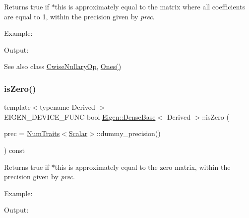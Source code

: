 \begin{DoxyReturn}{Returns}
true if $\ast$this is approximately equal to the matrix where all coefficients are equal to 1, within the precision given by {\itshape prec}.
\end{DoxyReturn}
Example\+: 
\begin{DoxyCodeInclude}{0}
\end{DoxyCodeInclude}
 Output\+: 
\begin{DoxyVerbInclude}
\end{DoxyVerbInclude}


\begin{DoxySeeAlso}{See also}
class \mbox{\hyperlink{class_eigen_1_1_cwise_nullary_op}{Cwise\+Nullary\+Op}}, \mbox{\hyperlink{class_eigen_1_1_dense_base_a1284a38971d817c33e40c226f6347e37}{Ones()}} 
\end{DoxySeeAlso}
\mbox{\label{class_eigen_1_1_dense_base_aad9b1b1368b249e0e0f14b7f2960fb58}} 
\subsubsection{\texorpdfstring{isZero()}{isZero()}}
{\footnotesize\ttfamily template$<$typename Derived $>$ \\
E\+I\+G\+E\+N\+\_\+\+D\+E\+V\+I\+C\+E\+\_\+\+F\+U\+NC bool \mbox{\hyperlink{class_eigen_1_1_dense_base}{Eigen\+::\+Dense\+Base}}$<$ Derived $>$\+::is\+Zero (\begin{DoxyParamCaption}\item[{const Real\+Scalar \&}]{prec = {\ttfamily \mbox{\hyperlink{struct_eigen_1_1_num_traits}{Num\+Traits}}$<$\mbox{\hyperlink{class_eigen_1_1_dense_base_a5feed465b3a8e60c47e73ecce83e39a2}{Scalar}}$>$\+:\+:dummy\+\_\+precision()} }\end{DoxyParamCaption}) const}

\begin{DoxyReturn}{Returns}
true if $\ast$this is approximately equal to the zero matrix, within the precision given by {\itshape prec}.
\end{DoxyReturn}
Example\+: 
\begin{DoxyCodeInclude}{0}
\end{DoxyCodeInclude}
 Output\+: 
\begin{DoxyVerbInclude}
\end{DoxyVerbInclude}


